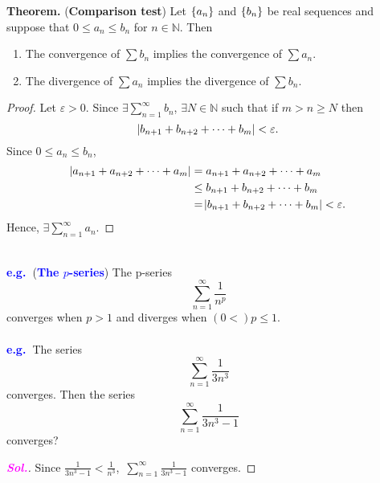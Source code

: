 \documentclass[12pt,a4paper]{article}
\newcommand{\dispsty}{\displaystyle}
\newcommand{\sol}{\textcolor{magenta}{\bf \textit{Sol.}}\quad}
\newcommand{\eg}{\textcolor{blue}{\bf e.g.\ \quad }}
\begin{document}
\begin{tcolorbox}[colback=white]
	\textbf{Theorem.} (\textbf{Comparison test}) Let $\set{a_n}$ and $\set{b_n}$ be real sequences and suppose that $0\leq a_n\leq b_n$ for $n\in\mathbb{N}$. Then \begin{enumerate}
		\item The convergence of $\sum b_n$ implies the convergence of $\sum a_n$.
		\item The divergence of $\sum a_n$ implies the divergence of $\sum b_n$.
	\end{enumerate}\tcblower\begin{proof}
	Let $\varepsilon>0$. Since $\exists\sum_{n=1}^{\infty}b_n$, $\exists N\in\mathbb{N}$ such that if $m>n\geq N$ then \[
	\abs{b_{n+1}+b_{n+2}+\cdots+b_m }<\varepsilon.
	\] Since $0\leq a_n\leq b_n$, \begin{align*}
	\abs{a_{n+1}+a_{n+2}+\cdots+a_m } &= a_{n+1}+a_{n+2}+\cdots+a_m \\
	&\leq b_{n+1}+b_{n+2}+\cdots+b_m \\
	&=\abs{b_{n+1}+b_{n+2}+\cdots+b_m }<\varepsilon.
	\end{align*} Hence, $\exists\sum_{n=1}^\infty a_n$.
\end{proof}
\end{tcolorbox}\
\\
\eg (\textcolor{blue}{\bf The $p$-series}) The p-series \[
\sum_{n=1}^\infty\frac{1}{n^p}
\] converges when $p>1$ and diverges when $(0<)p\leq 1$.\\
\\
\eg The series \[
\sum_{n=1}^\infty\frac{1}{3n^3}
\] converges. Then the series \[
\sum_{n=1}^\infty\frac{1}{3n^3-1}
\] converges?\begin{proof}[\sol]
	Since $\dispsty\frac{1}{3n^3-1}<\frac{1}{n^3}$,\ $\dispsty\sum_{n=1}^\infty\frac{1}{3n^3-1}$ converges.
\end{proof}
\end{document}

